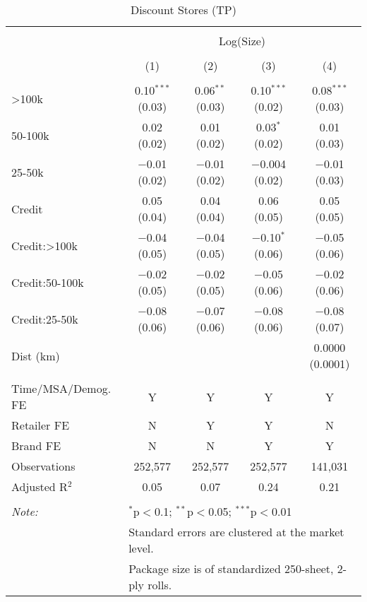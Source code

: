 
\begin{table}[!htbp] \centering 
  \caption{Discount Stores (TP)} 
  \label{tab:packageSizeDiscountLiq} 
\begin{tabular}{@{\extracolsep{5pt}}lcccc} 
\\[-1.8ex]\hline 
\hline \\[-1.8ex] 
 & \multicolumn{4}{c}{Log(Size)} \\ 
\\[-1.8ex] & (1) & (2) & (3) & (4)\\ 
\hline \\[-1.8ex] 
 >100k & 0.10$^{***}$ (0.03) & 0.06$^{**}$ (0.03) & 0.10$^{***}$ (0.02) & 0.08$^{***}$ (0.03) \\ 
  50-100k & 0.02 (0.02) & 0.01 (0.02) & 0.03$^{*}$ (0.02) & 0.01 (0.03) \\ 
  25-50k & $-$0.01 (0.02) & $-$0.01 (0.02) & $-$0.004 (0.02) & $-$0.01 (0.03) \\ 
  Credit & 0.05 (0.04) & 0.04 (0.04) & 0.06 (0.05) & 0.05 (0.05) \\ 
  Credit:>100k & $-$0.04 (0.05) & $-$0.04 (0.05) & $-$0.10$^{*}$ (0.06) & $-$0.05 (0.06) \\ 
  Credit:50-100k & $-$0.02 (0.05) & $-$0.02 (0.05) & $-$0.05 (0.06) & $-$0.02 (0.06) \\ 
  Credit:25-50k & $-$0.08 (0.06) & $-$0.07 (0.06) & $-$0.08 (0.06) & $-$0.08 (0.07) \\ 
  Dist (km) &  &  &  & 0.0000 (0.0001) \\ 
 \hline \\[-1.8ex] 
Time/MSA/Demog. FE & Y & Y & Y & Y \\ 
Retailer FE & N & Y & Y & N \\ 
Brand FE & N & N & Y & Y \\ 
Observations & 252,577 & 252,577 & 252,577 & 141,031 \\ 
Adjusted R$^{2}$ & 0.05 & 0.07 & 0.24 & 0.21 \\ 
\hline 
\hline \\[-1.8ex] 
\textit{Note:}  & \multicolumn{4}{l}{$^{*}$p$<$0.1; $^{**}$p$<$0.05; $^{***}$p$<$0.01} \\ 
 & \multicolumn{4}{l}{Standard errors are clustered at the market level.} \\ 
 & \multicolumn{4}{l}{Package size is of standardized 250-sheet, 2-ply rolls.} \\ 
\end{tabular} 
\end{table} 
